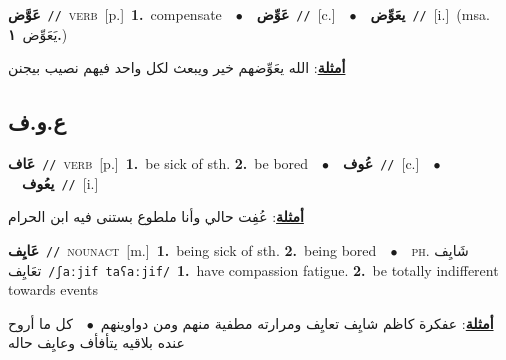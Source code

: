 \documentclass[10pt,a4paper,twoside]{article} %
\begin{document}
\begin{multicols}{2}
{\setlength\topsep{0pt}\textbf{\foreignlanguage{arabic}{عَوَّض}}\ {\color{gray}\texttt{//}\color{black}}\ \textsc{verb}\ [p.]\ \textbf{1.}~compensate\ \ $\bullet$\ \ \setlength\topsep{0pt}\textbf{\foreignlanguage{arabic}{عَوِّض}}\ {\color{gray}\texttt{//}\color{black}}\ [c.]\ \ $\bullet$\ \ \setlength\topsep{0pt}\textbf{\foreignlanguage{arabic}{يعَوِّض}}\ {\color{gray}\texttt{//}\color{black}}\ [i.]\ \color{gray}(msa. \foreignlanguage{arabic}{يَعَوِّض}~\foreignlanguage{arabic}{\textbf{١.}})\color{black}\  \begin{flushright}\color{gray}\foreignlanguage{arabic}{\textbf{\underline{\foreignlanguage{arabic}{أمثلة}}}: الله يعَوِّضهم خير ويبعث لكل واحد فيهم نصيب بيجنن}\end{flushright}\color{black}} \vspace{2mm}

\vspace{-3mm}
\subsection*{\color{blue}\foreignlanguage{arabic}{ع.و.ف}\color{blue}{}} 

{\setlength\topsep{0pt}\textbf{\foreignlanguage{arabic}{عَاف}}\ {\color{gray}\texttt{//}\color{black}}\ \textsc{verb}\ [p.]\ \textbf{1.}~be sick of sth.  \textbf{2.}~be bored\ \ $\bullet$\ \ \setlength\topsep{0pt}\textbf{\foreignlanguage{arabic}{عُوف}}\ {\color{gray}\texttt{//}\color{black}}\ [c.]\ \ $\bullet$\ \ \setlength\topsep{0pt}\textbf{\foreignlanguage{arabic}{يعُوف}}\ {\color{gray}\texttt{//}\color{black}}\ [i.]\  \begin{flushright}\color{gray}\foreignlanguage{arabic}{\textbf{\underline{\foreignlanguage{arabic}{أمثلة}}}: عُفِت حالي وأنا ملطوع بستنى فيه ابن الحرام}\end{flushright}\color{black}} \vspace{2mm}

{\setlength\topsep{0pt}\textbf{\foreignlanguage{arabic}{عَايِف}}\ {\color{gray}\texttt{//}\color{black}}\ \textsc{noun\textunderscore act}\ [m.]\ \textbf{1.}~being sick of sth.  \textbf{2.}~being bored\ \ $\bullet$\ \ \textsc{ph.} \color{gray} \foreignlanguage{arabic}{شَايِف تعَايِف}\color{black}\ {\color{gray}\texttt{/{\sffamily ʃaːjif taʕaːjif}/}\color{black}}\ \textbf{1.}~have compassion fatigue.  \textbf{2.}~be totally indifferent towards events\  \begin{flushright}\color{gray}\foreignlanguage{arabic}{\textbf{\underline{\foreignlanguage{arabic}{أمثلة}}}: عفكرة كاظم شايِف تعايِف ومرارته مطفية منهم ومن دواوينهم\ $\bullet$\ \  كل ما أروح عنده بلاقيه يتأفأف وعايِف حاله}\end{flushright}\color{black}} \vspace{2mm}


\end{multicols}
\end{document}
